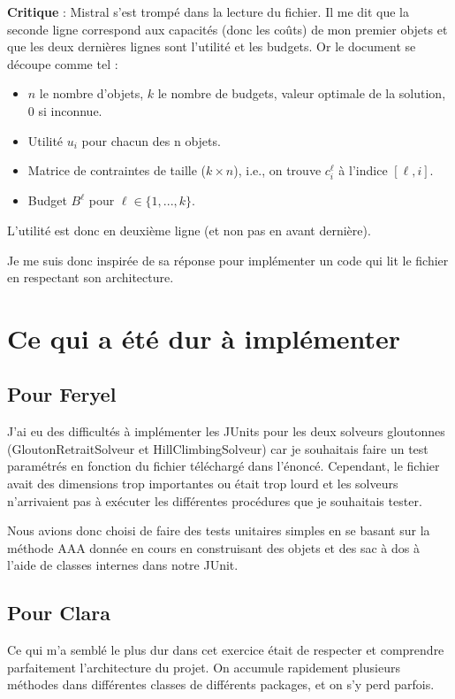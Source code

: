 \documentclass[11pt]{article}
\begin{document}
\textbf{Critique} : Mistral s’est trompé dans la lecture du fichier. Il me dit que la seconde ligne correspond aux capacités (donc les coûts) de mon premier objets et que les deux dernières lignes sont l’utilité et les budgets. Or le document se découpe comme tel : 
\begin{itemize}
	\item  $n$ le nombre d’objets, $k$ le nombre de budgets, valeur optimale de la solution, $0$ si inconnue.
	\item  Utilité $u_i$ pour chacun des n objets.
	\item  Matrice de contraintes de taille ($k \times n$), i.e., on trouve $c^\ell_i$ à l’indice $[\ell,i]$.
	\item Budget $B^\ell$ pour $\ell \in \{1,...,k\}$.
\end{itemize}
L’utilité est donc en deuxième ligne (et non pas en avant dernière). 

Je me suis donc inspirée de sa réponse pour implémenter un code qui lit le fichier en respectant son architecture.

\section{Ce qui a été dur à implémenter}

\subsection{Pour Feryel}

J’ai eu des difficultés à implémenter les JUnits pour les deux solveurs gloutonnes (GloutonRetraitSolveur et HillClimbingSolveur) car je souhaitais faire un test paramétrés en fonction du fichier téléchargé dans l’énoncé. Cependant, le fichier avait des dimensions trop importantes ou était trop lourd et les solveurs n'arrivaient pas à exécuter les différentes procédures que je souhaitais tester.

Nous avions donc choisi de faire des tests unitaires simples en se basant sur la méthode AAA donnée en cours en construisant des objets et des sac à dos à l’aide de classes internes dans notre JUnit. 

\subsection{Pour Clara}

Ce qui m'a semblé le plus dur dans cet exercice était de respecter et comprendre parfaitement l'architecture du projet. On accumule rapidement plusieurs méthodes dans différentes classes de différents packages, et on s'y perd parfois. 
\end{document}
